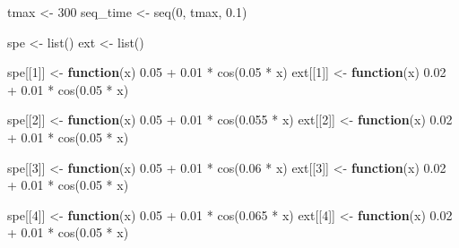 \documentclass[
]{article}
\newenvironment{Shaded}{\begin{snugshade}}{\end{snugshade}}
\newcommand{\ControlFlowTok}[1]{\textcolor[rgb]{0.13,0.29,0.53}{\textbf{#1}}}
\newcommand{\DecValTok}[1]{\textcolor[rgb]{0.00,0.00,0.81}{#1}}
\newcommand{\FloatTok}[1]{\textcolor[rgb]{0.00,0.00,0.81}{#1}}
\newcommand{\FunctionTok}[1]{\textcolor[rgb]{0.00,0.00,0.00}{#1}}
\newcommand{\NormalTok}[1]{#1}
\newcommand{\OtherTok}[1]{\textcolor[rgb]{0.56,0.35,0.01}{#1}}
\newcommand{\SpecialCharTok}[1]{\textcolor[rgb]{0.00,0.00,0.00}{#1}}
\begin{document}
\begin{Shaded}
\begin{Highlighting}[]
\NormalTok{tmax }\OtherTok{\textless{}{-}} \DecValTok{300}
\NormalTok{seq\_time }\OtherTok{\textless{}{-}} \FunctionTok{seq}\NormalTok{(}\DecValTok{0}\NormalTok{, tmax, }\FloatTok{0.1}\NormalTok{)}

\NormalTok{spe }\OtherTok{\textless{}{-}} \FunctionTok{list}\NormalTok{()}
\NormalTok{ext }\OtherTok{\textless{}{-}} \FunctionTok{list}\NormalTok{()}

\NormalTok{spe[[}\DecValTok{1}\NormalTok{]] }\OtherTok{\textless{}{-}} \ControlFlowTok{function}\NormalTok{(x) }\FloatTok{0.05} \SpecialCharTok{+} \FloatTok{0.01} \SpecialCharTok{*} \FunctionTok{cos}\NormalTok{(}\FloatTok{0.05} \SpecialCharTok{*}\NormalTok{ x)}
\NormalTok{ext[[}\DecValTok{1}\NormalTok{]] }\OtherTok{\textless{}{-}} \ControlFlowTok{function}\NormalTok{(x) }\FloatTok{0.02} \SpecialCharTok{+} \FloatTok{0.01} \SpecialCharTok{*} \FunctionTok{cos}\NormalTok{(}\FloatTok{0.05} \SpecialCharTok{*}\NormalTok{ x)}

\NormalTok{spe[[}\DecValTok{2}\NormalTok{]] }\OtherTok{\textless{}{-}} \ControlFlowTok{function}\NormalTok{(x) }\FloatTok{0.05} \SpecialCharTok{+} \FloatTok{0.01} \SpecialCharTok{*} \FunctionTok{cos}\NormalTok{(}\FloatTok{0.055} \SpecialCharTok{*}\NormalTok{ x)}
\NormalTok{ext[[}\DecValTok{2}\NormalTok{]] }\OtherTok{\textless{}{-}} \ControlFlowTok{function}\NormalTok{(x) }\FloatTok{0.02} \SpecialCharTok{+} \FloatTok{0.01} \SpecialCharTok{*} \FunctionTok{cos}\NormalTok{(}\FloatTok{0.05} \SpecialCharTok{*}\NormalTok{ x)}

\NormalTok{spe[[}\DecValTok{3}\NormalTok{]] }\OtherTok{\textless{}{-}} \ControlFlowTok{function}\NormalTok{(x) }\FloatTok{0.05} \SpecialCharTok{+} \FloatTok{0.01} \SpecialCharTok{*} \FunctionTok{cos}\NormalTok{(}\FloatTok{0.06} \SpecialCharTok{*}\NormalTok{ x)}
\NormalTok{ext[[}\DecValTok{3}\NormalTok{]] }\OtherTok{\textless{}{-}} \ControlFlowTok{function}\NormalTok{(x) }\FloatTok{0.02} \SpecialCharTok{+} \FloatTok{0.01} \SpecialCharTok{*} \FunctionTok{cos}\NormalTok{(}\FloatTok{0.05} \SpecialCharTok{*}\NormalTok{ x)}

\NormalTok{spe[[}\DecValTok{4}\NormalTok{]] }\OtherTok{\textless{}{-}} \ControlFlowTok{function}\NormalTok{(x) }\FloatTok{0.05} \SpecialCharTok{+} \FloatTok{0.01} \SpecialCharTok{*} \FunctionTok{cos}\NormalTok{(}\FloatTok{0.065} \SpecialCharTok{*}\NormalTok{ x)}
\NormalTok{ext[[}\DecValTok{4}\NormalTok{]] }\OtherTok{\textless{}{-}} \ControlFlowTok{function}\NormalTok{(x) }\FloatTok{0.02} \SpecialCharTok{+} \FloatTok{0.01} \SpecialCharTok{*} \FunctionTok{cos}\NormalTok{(}\FloatTok{0.05} \SpecialCharTok{*}\NormalTok{ x)}
\end{Highlighting}
\end{Shaded}
\end{document}
